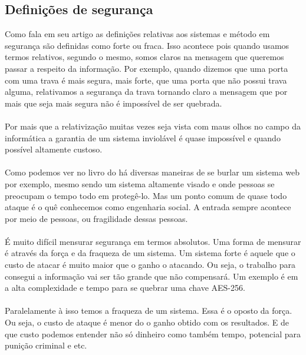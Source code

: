 \subsection{Defini\c{c}\~oes de seguran\c{c}a}
\label{subsection:definicoes_seguranca}
Como \cite{o2003comparing} fala em seu artigo as defini\c{c}\~oes relativas aos sistemas e m\'etodo em seguran\c{c}a s\~ao definidas como forte ou fraca. Isso acontece pois quando usamos termos relativos, segundo o mesmo, somos claros na mensagem que queremos passar a respeito da informa\c{c}\~ao. Por exemplo, quando dizemos que uma porta com uma trava \'e mais segura, mais forte, que uma porta que n\~ao possui trava alguma, relativamos a seguran\c{c}a da trava tornando claro a mensagem que por mais que seja mais segura n\~ao \'e imposs\'ivel de ser quebrada.
\paragraph{}
Por mais que a relativiza\c{c}\~ao muitas vezes seja vista com maus olhos no campo da inform\'atica a garantia de um sistema inviol\'avel \'e quase imposs\'ivel e quando poss\'ivel altamente custoso. 
\paragraph{}
Como podemos ver no livro do \cite{stuttard2011web} h\'a diversas maneiras de se burlar um sistema web por exemplo, mesmo sendo um sistema altamente visado e onde pessoas se preocupam o tempo todo em proteg\^e-lo. Mas um ponto comum de quase todo ataque \'e o qu\^e conhecemos como engenharia social. A entrada sempre acontece por meio de pessoas, ou fragilidade dessas pessoas.
\paragraph{}
\'E muito dif\'icil mensurar seguran\c{c}a em termos absolutos. Uma forma de mensurar \'e atrav\'es da for\c{c}a e da fraqueza de um sistema. Um sistema forte \'e aquele que o custo de atacar \'e muito maior que o ganho o atacando. Ou seja, o trabalho para consegui a informa\c{c}\~ao vai ser t\~ao grande que n\~ao compensar\'a. Um exemplo \'e em \cite{biryukov2010key} a alta complexidade e tempo para se quebrar uma chave AES-256.
\paragraph{}
Paralelamente \`a isso temos a fraqueza de um sistema. Essa \'e o oposto da for\c{c}a. Ou seja, o custo de ataque \'e menor do o ganho obtido com os resultados. E de que custo podemos entender n\~ao s\'o dinheiro como tamb\'em tempo, potencial para puni\c{c}\~ao criminal e etc.
